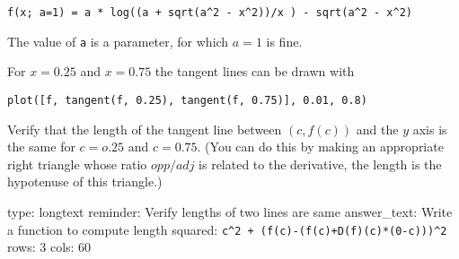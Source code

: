 \documentclass[12pt]{article}
\begin{document}
\begin{verbatim}
f(x; a=1) = a * log((a + sqrt(a^2 - x^2))/x ) - sqrt(a^2 - x^2)
\end{verbatim}
The value of \texttt{a} is a parameter, for which $a=1$ is fine.

For $x=0.25$ and $x=0.75$ the tangent lines can be drawn with



\begin{verbatim}
plot([f, tangent(f, 0.25), tangent(f, 0.75)], 0.01, 0.8)
\end{verbatim}
Verify that the length of the tangent line between $(c, f(c))$ and the
$y$ axis is the same for $c=o.25$ and $c=0.75$. (You can do this by
making an appropriate right triangle whose ratio $opp/adj$ is related to
the derivative, the length is the hypotenuse of this triangle.)

\begin{answer}
type: longtext
reminder: Verify lengths of two lines are same
answer_text: Write a function to compute length squared: \verb#c^2 + (f(c)-(f(c)+D(f)(c)*(0-c)))^2# 
rows: 3
cols: 60
\end{answer}
\end{document}
